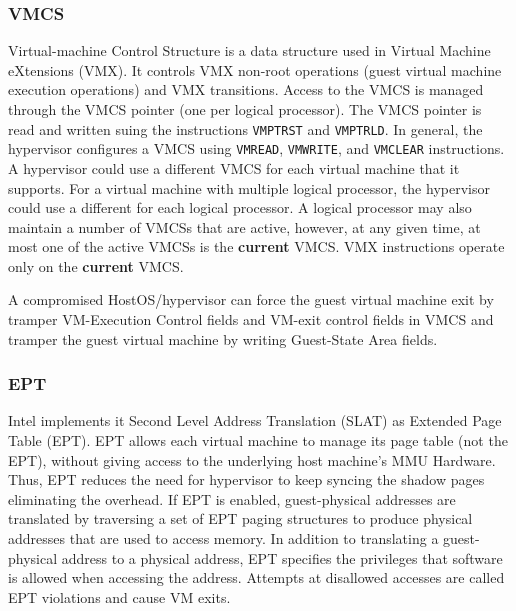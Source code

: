 \subsubsection{VMCS}%
\label{ssub:vmcs}
Virtual-machine Control Structure is a data structure used in Virtual Machine eXtensions (VMX). It controls VMX non-root operations (guest virtual machine execution operations) and VMX transitions. Access to the VMCS is managed through the VMCS pointer (one per logical processor). The VMCS pointer is read and written suing the instructions \verb|VMPTRST| and \verb|VMPTRLD|. In general, the hypervisor configures a VMCS using \verb|VMREAD|, \verb|VMWRITE|, and \verb|VMCLEAR| instructions. A hypervisor could use a different VMCS for each virtual machine that it supports. For a virtual machine with multiple logical processor, the hypervisor could use a different for each logical processor. A logical processor may also maintain a number of VMCSs that are active, however, at any given time, at most one of the active VMCSs is the \textbf{current} VMCS. VMX instructions operate only on the \textbf{current} VMCS. 

A compromised HostOS/hypervisor can force the guest virtual machine exit by tramper VM-Execution Control fields and VM-exit control fields in VMCS and tramper the guest virtual machine by writing Guest-State Area fields. 




\subsubsection{EPT}%
\label{ssub:ept}
Intel implements it Second Level Address Translation (SLAT) as Extended Page Table (EPT). 
EPT allows each virtual machine to manage its page table (not the EPT), without giving access to the underlying host machine's MMU Hardware. Thus, EPT reduces the need for hypervisor to keep syncing the shadow pages eliminating the overhead.
If EPT is enabled, guest-physical addresses are translated by traversing a set of EPT paging structures to produce physical addresses that are used to access memory.
In addition to translating a guest-physical address to a physical address, EPT specifies the privileges that software is allowed when accessing the address. Attempts at disallowed accesses are called EPT violations and cause VM exits.

